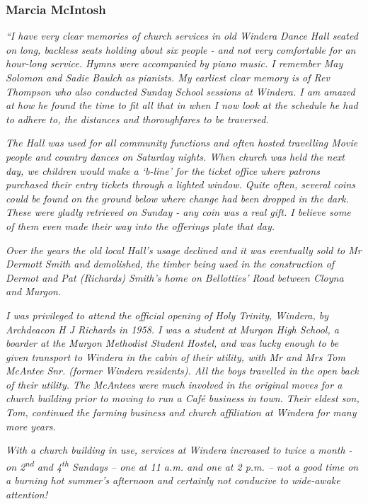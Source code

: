 \hypertarget{marcia-mcintosh}{%
\subsubsection{Marcia McIntosh}\label{marcia-mcintosh}}

\emph{``I have very clear memories of church services in old Windera Dance Hall seated on long, backless seats holding about six people - and not very comfortable for an hour-long service. Hymns were accompanied by piano music. I remember May Solomon and Sadie Baulch as pianists. My earliest clear memory is of Rev Thompson who also conducted Sunday School sessions at Windera. I am amazed at how he found the time to fit all that in when I now look at the schedule he had to adhere to, the distances and thoroughfares to be traversed.}

\emph{The Hall was used for all community functions and often hosted travelling Movie people and country dances on Saturday nights. When church was held the next day, we children would make a `b-line' for the ticket office where patrons purchased their entry tickets through a lighted window. Quite often, several coins could be found on the ground below where change had been dropped in the dark. These were gladly retrieved on Sunday - any coin was a real gift. I believe some of them even made their way into the offerings plate that day.}

\emph{Over the years the old local Hall's usage declined and it was eventually sold to Mr Dermott Smith and demolished, the timber being used in the construction of Dermot and Pat (Richards) Smith's home on Bellotties' Road between Cloyna and Murgon.}

\emph{I was privileged to attend the official opening of Holy Trinity, Windera, by Archdeacon H J Richards in 1958. I was a student at Murgon High School, a boarder at the Murgon Methodist Student Hostel, and was lucky enough to be given transport to Windera in the cabin of their utility, with Mr and Mrs Tom McAntee Snr. (former Windera residents). All the boys travelled in the open back of their utility. The McAntees were much involved in the original moves for a church building prior to moving to run a Café business in town. Their eldest son, Tom, continued the farming business and church affiliation at Windera for many more years.}

\emph{With a church building in use, services at Windera increased to twice a month - on 2\textsuperscript{nd} and 4\textsuperscript{th} Sundays -- one at 11 a.m. and one at 2 p.m. -- not a good time on a burning hot summer's afternoon and certainly not conducive to wide-awake attention!}

